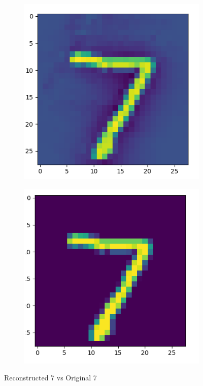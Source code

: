  \begin{figure}[h]
 \begin{subfigure}{.5\textwidth}
 \centering
 \includegraphics[scale=0.5]{../Results/SPORCO_MNIST/reconstruction.png}
 \end{subfigure}%
  \begin{subfigure}{.3\textwidth}
 \centering
 \includegraphics[scale=0.5]{../Results/SPORCO_MNIST/Original.png}

 \end{subfigure}%

\caption{Reconstructed 7 vs Original 7}
 \end{figure}


